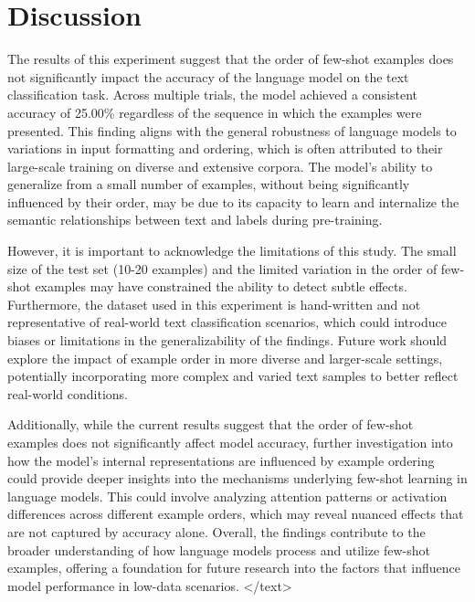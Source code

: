 \documentclass{article}
\begin{document}
\section*{Discussion}

The results of this experiment suggest that the order of few-shot examples does not significantly impact the accuracy of the language model on the text classification task. Across multiple trials, the model achieved a consistent accuracy of 25.00\% regardless of the sequence in which the examples were presented. This finding aligns with the general robustness of language models to variations in input formatting and ordering, which is often attributed to their large-scale training on diverse and extensive corpora. The model's ability to generalize from a small number of examples, without being significantly influenced by their order, may be due to its capacity to learn and internalize the semantic relationships between text and labels during pre-training.

However, it is important to acknowledge the limitations of this study. The small size of the test set (10-20 examples) and the limited variation in the order of few-shot examples may have constrained the ability to detect subtle effects. Furthermore, the dataset used in this experiment is hand-written and not representative of real-world text classification scenarios, which could introduce biases or limitations in the generalizability of the findings. Future work should explore the impact of example order in more diverse and larger-scale settings, potentially incorporating more complex and varied text samples to better reflect real-world conditions.

Additionally, while the current results suggest that the order of few-shot examples does not significantly affect model accuracy, further investigation into how the model's internal representations are influenced by example ordering could provide deeper insights into the mechanisms underlying few-shot learning in language models. This could involve analyzing attention patterns or activation differences across different example orders, which may reveal nuanced effects that are not captured by accuracy alone. Overall, the findings contribute to the broader understanding of how language models process and utilize few-shot examples, offering a foundation for future research into the factors that influence model performance in low-data scenarios.
</text>
\end{document}
